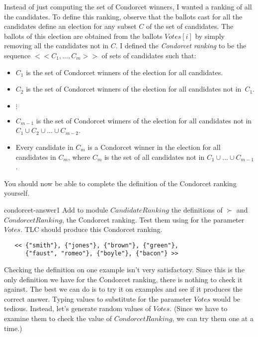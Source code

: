 \documentclass[fleqn,leqno]{article}
\begin{document}
Instead of just computing the set of Condorcet winners, I wanted a
ranking of all the candidates.  To define this ranking, observe that
the ballots cast for all the candidates define an election for any
subset $C$ of the set of candidates.  The ballots of this election are
obtained from the ballots $Votes[i]$ by simply removing all the
candidates not in $C$.  I defined the \emph{Condorcet ranking} to be
the sequence
 $<<C_{1}, \ldots, C_{m}>>$
of sets of candidates such that: 
\begin{itemize}
\item $C_{1}$ is the set of Condorcet winners of the election for
        all candidates.

\item $C_{2}$ is the set of Condorcet
winners of the election for all candidates not in~$C_{1}$.


\item[]  $\vdots$

\item $C_{m-1}$ is the set of Condorcet winners of the election for
all candidates not in $C_{1} \cup C_{2}\cup \ldots \cup C_{m-2}$.

\item Every candidate in 
$C_{m}$ is a Condorcet winner in the election for all candidates
in $C_{m}$, where $C_{m}$ is the set of
all candidates not in
        $C_{1}\cup\ldots\cup C_{m-1}$.
\end{itemize}
You should now be able to complete the definition of the Condorcet ranking
yourself.
\begin{aquestion}{condorcet-answer1} 
Add to module $CandidateRanking$ the definitions of $\succ$ and
$CondorcetRanking$, the Condorcet ranking.  Test them using
 for the parameter $Votes$.  TLC should
produce this Condorcet ranking.
\begin{verbatim}
   << {"smith"}, {"jones"}, {"brown"}, {"green"}, 
      {"faust", "romeo"}, {"boyle"}, {"bacon"} >>
\end{verbatim}
\end{aquestion}
Checking the definition on one example isn't very satisfactory.  Since
this is the only definition we have for the Condorcet ranking, there
is nothing to check it against.  The best we can do is to try it on
examples and see if it produces the correct answer.  Typing values to
substitute for the parameter $Votes$ would be tedious.  Instead, let's
generate random values of $Votes$.  (Since we have to examine them to
check the value of $CondorcetRanking$, we can try them one at a time.)
\end{document}
